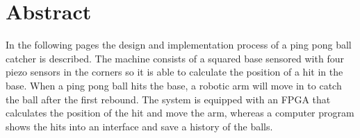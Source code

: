 \chapter*{Abstract}
In the following pages the design and implementation process of a ping pong ball catcher is described. The machine consists of a squared base sensored with four piezo sensors in the corners so it is able to calculate the position of a hit in the base. 
When a ping pong ball hits the base, a robotic arm will move in to catch the ball after the first rebound.
The system is equipped with an FPGA that calculates the position of the hit and move the arm, whereas a computer program shows the hits into an interface and save a history of the balls.